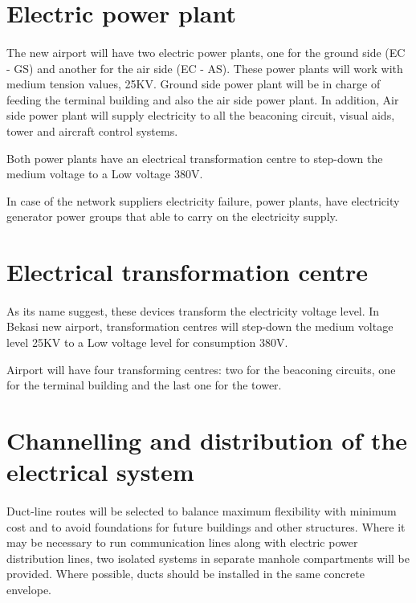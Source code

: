	\section{Electric power plant}
	\paragraph{} The new airport will have two electric power plants, one for the ground side (EC - GS) and another for the air side (EC - AS). These power plants will work with medium tension values, 25KV. Ground side power plant will be in charge of feeding the terminal building and also the air side power plant. In addition, Air side power plant will supply electricity to all the beaconing circuit, visual aids, tower and aircraft control systems.
	
	Both power plants have an electrical transformation centre to step-down the medium voltage to a Low voltage 380V.
	
	In case of the network suppliers electricity failure, power plants, have electricity generator power groups that able to carry on the electricity supply.
	 	
	
	\section{Electrical transformation centre}
	\paragraph{} As its name suggest, these devices transform the electricity voltage level. In Bekasi new airport, transformation centres will step-down the medium voltage level 25KV to a Low voltage level for consumption 380V.
	
	Airport will have four transforming centres: two for the beaconing circuits, one for the terminal building and the last one for the tower.
	
	
	\section{Channelling and distribution of the electrical system}
	\paragraph{} Duct-line routes will be selected to balance maximum flexibility with minimum cost and to avoid foundations for future buildings and other structures. Where it may be necessary to run communication lines along with electric power distribution lines, two isolated systems in separate manhole compartments will be provided. Where possible, ducts should be installed in the same concrete envelope.
	
